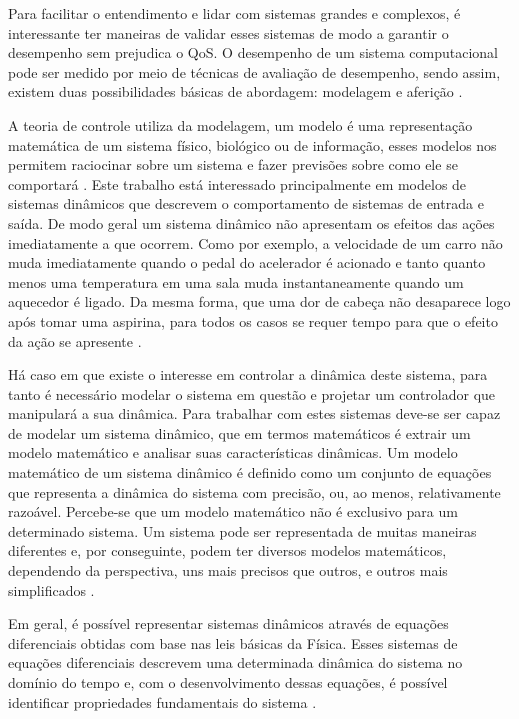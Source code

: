 Para facilitar o entendimento e lidar com sistemas grandes e complexos, é interessante ter maneiras de validar esses sistemas de modo a garantir o desempenho sem prejudica o QoS. O desempenho de um sistema computacional pode ser medido por meio de técnicas de avaliação de desempenho, sendo assim, existem duas possibilidades básicas de abordagem: modelagem e aferição \cite{Jain1991}.

A teoria de controle utiliza da modelagem, um modelo é uma representação matemática de um sistema físico, biológico ou de informação, esses modelos nos permitem raciocinar sobre um sistema e fazer previsões sobre como ele se comportará \cite{Karl2008}. Este trabalho está interessado principalmente em modelos de sistemas dinâmicos que descrevem o comportamento de sistemas de entrada e saída. De modo geral um sistema dinâmico não apresentam os efeitos das ações imediatamente a que ocorrem. Como por exemplo, a velocidade de um carro não muda imediatamente quando o pedal do acelerador é acionado e tanto quanto menos uma temperatura em uma sala muda instantaneamente quando um aquecedor é ligado. Da mesma forma, que uma dor de cabeça não desaparece logo após tomar uma aspirina, para todos os casos se requer tempo para que o efeito da ação se apresente \cite{Karl2008}.

Há caso em que existe o interesse em controlar a dinâmica deste sistema, para tanto é necessário modelar o sistema em questão e projetar um controlador que manipulará a sua dinâmica. Para trabalhar com estes sistemas deve-se ser capaz de modelar um sistema dinâmico, que em termos matemáticos é extrair um modelo matemático e analisar suas características dinâmicas. Um modelo matemático de um sistema dinâmico é definido como um conjunto de equações que representa a dinâmica do sistema com precisão, ou, ao menos, relativamente razoável. Percebe-se que um modelo matemático não é exclusivo para um determinado sistema. Um sistema pode ser representada de muitas maneiras diferentes e, por conseguinte, podem ter diversos modelos matemáticos, dependendo da perspectiva, uns mais precisos que outros, e outros mais simplificados \cite{Ogata2001}.

Em geral, é possível representar sistemas dinâmicos através de equações diferenciais obtidas com base nas leis básicas da Física. Esses sistemas de equações diferenciais descrevem uma determinada dinâmica do sistema no domínio do tempo e, com o desenvolvimento dessas equações, é possível identificar propriedades fundamentais do sistema \cite{Nobile2013}.


